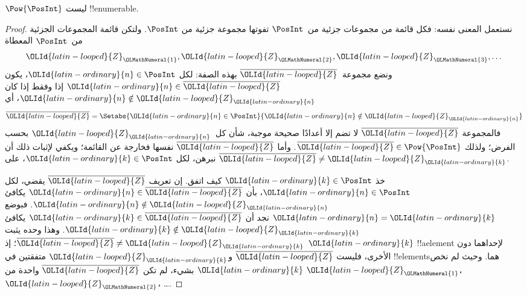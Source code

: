 \documentclass[../../../include/open-logic-section]{subfiles}
\begin{document}
\begin{thm}
$\Pow{\PosInt}$ ليست !!{enumerable}.
\end{thm}

\begin{proof}
نستعمل المعنى نفسه: فكل قائمة من مجموعات جزئية من~$\PosInt$ تفوتها مجموعة جزئية من $\PosInt$. ولتكن قائمة المجموعات الجزئية من~$\PosInt$ المعطاة
\[
\OLId{latin-looped}{Z}_{\OLMathNumeral{1}}, \OLId{latin-looped}{Z}_{\OLMathNumeral{2}}, \OLId{latin-looped}{Z}_{\OLMathNumeral{3}}, \dots
\]
ونضع مجموعة~$\overline{\OLId{latin-looped}{Z}}$ بهذه الصفة: لكل $\OLId{latin-ordinary}{n} \in \PosInt$، يكون $\OLId{latin-ordinary}{n} \in \overline{\OLId{latin-looped}{Z}}$ إذا وفقط إذا كان $\OLId{latin-ordinary}{n} \notin \OLId{latin-looped}{Z}_{\OLId{latin-ordinary}{n}}$، أي
\[
\overline{\OLId{latin-looped}{Z}} = \Setabs{\OLId{latin-ordinary}{n} \in \PosInt}{\OLId{latin-ordinary}{n} \notin \OLId{latin-looped}{Z}_\OLId{latin-ordinary}{n}}
\]
فالمجموعة $\overline{\OLId{latin-looped}{Z}}$ لا تضم إلا أعدادًا صحيحة موجبة، شأن كل~$\OLId{latin-looped}{Z}_\OLId{latin-ordinary}{n}$ بحسب الفرض؛ ولذلك $\overline{\OLId{latin-looped}{Z}} \in
\Pow{\PosInt}$. وأما $\overline{\OLId{latin-looped}{Z}}$ نفسها فخارجة عن القائمة؛ ويكفي لإثبات ذلك أن نبرهن، لكل $\OLId{latin-ordinary}{k} \in \PosInt$، على $\overline{\OLId{latin-looped}{Z}} \neq
\OLId{latin-looped}{Z}_\OLId{latin-ordinary}{k}$.

خذ $\OLId{latin-ordinary}{k} \in \PosInt$ كيف اتفق. إن تعريف $\overline{\OLId{latin-looped}{Z}}$ يقضي، لكل $\OLId{latin-ordinary}{n} \in \PosInt$، بأن $\OLId{latin-ordinary}{n} \in \overline{\OLId{latin-looped}{Z}}$ يكافئ $\OLId{latin-ordinary}{n} \notin \OLId{latin-looped}{Z}_\OLId{latin-ordinary}{n}$. فبوضع $\OLId{latin-ordinary}{n}=\OLId{latin-ordinary}{k}$ نجد أن $\OLId{latin-ordinary}{k} \in \overline{\OLId{latin-looped}{Z}}$ يكافئ $\OLId{latin-ordinary}{k} \notin \OLId{latin-looped}{Z}_\OLId{latin-ordinary}{k}$. وهذا وحده يثبت $\overline{\OLId{latin-looped}{Z}} \neq \OLId{latin-looped}{Z}_\OLId{latin-ordinary}{k}$؛ إذ $\OLId{latin-ordinary}{k}$ !!a{element} لإحداهما دون الأخرى، فليست $\overline{\OLId{latin-looped}{Z}}$ و$\OLId{latin-looped}{Z}_\OLId{latin-ordinary}{k}$ متفقتين في !!{element}sهما. وحيث لم نخص $\OLId{latin-ordinary}{k}$ بشيء، لم تكن $\overline{\OLId{latin-looped}{Z}}$ واحدة من $\OLId{latin-looped}{Z}_\OLMathNumeral{1}$، $\OLId{latin-looped}{Z}_\OLMathNumeral{2}$، \dots.
\end{proof}
\end{document}
